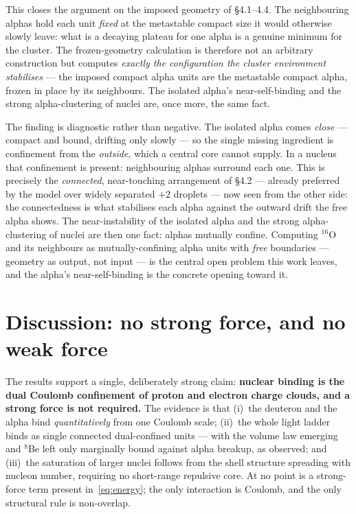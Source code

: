 \documentclass[11pt]{article}
\begin{document}
This closes the argument on the imposed geometry of \S4.1--4.4. The neighbouring alphas hold each
unit \emph{fixed} at the metastable compact size it would otherwise slowly leave: what is a
decaying plateau for one alpha is a genuine minimum for the cluster. The frozen-geometry
calculation is therefore not an arbitrary construction but computes \emph{exactly the
configuration the cluster environment stabilises} --- the imposed compact alpha units are the
metastable compact alpha, frozen in place by its neighbours. The isolated alpha's near-self-binding
and the strong alpha-clustering of nuclei are, once more, the same fact.

The finding is diagnostic rather than negative. The isolated alpha comes \emph{close} --- compact
and bound, drifting only slowly --- so the single missing ingredient is confinement from the
\emph{outside}, which a central core cannot supply. In a nucleus that confinement is present:
neighbouring alphas surround each one. This is precisely the \emph{connected}, near-touching
arrangement of \S4.2 --- already preferred by the model over widely separated $+2$ droplets ---
now seen from the other side: the connectedness is what stabilises each alpha against the outward
drift the free alpha shows. The near-instability of the isolated alpha and the strong
alpha-clustering of nuclei are then one fact: alphas mutually confine. Computing $^{16}$O and its
neighbours as mutually-confining alpha units with \emph{free} boundaries --- geometry as output,
not input --- is the central open problem this work leaves, and the alpha's near-self-binding is
the concrete opening toward it.

\section{Discussion: no strong force, and no weak force}

The results support a single, deliberately strong claim: \textbf{nuclear binding is the dual
Coulomb confinement of proton and electron charge clouds, and a strong force is not required.}
The evidence is that (i)~the deuteron and the alpha bind \emph{quantitatively} from one Coulomb
scale; (ii)~the whole light ladder binds as single connected dual-confined units --- with the
volume law emerging and $^8$Be left only marginally bound against alpha breakup, as observed;
and (iii)~the saturation of larger nuclei follows from the shell
structure spreading with nucleon number, requiring no short-range repulsive core. At no point is
a strong-force term present in~\eqref{eq:energy}; the only interaction is Coulomb, and the only
structural rule is non-overlap.
\end{document}
